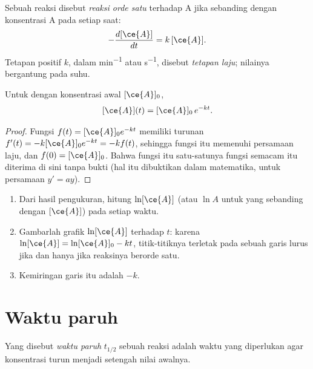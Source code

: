 \begin{definition}\label{def:g12:reaction-rates:first-order}
Sebuah reaksi disebut \emph{reaksi orde satu}
terhadap A jika  sebanding dengan konsentrasi A pada
setiap saat:
\[
  -\frac{d[\ce{A}]}{dt} = k\,[\ce{A}] .
\]
Tetapan positif $k$, dalam \si{min^{-1}} atau \si{s^{-1}}, disebut
\emph{tetapan laju}; nilainya bergantung pada suhu.
\end{definition}

\begin{proposition}\label{prop:g12:reaction-rates:exponential}
Untuk  dengan konsentrasi awal $[\ce{A}]_0$,
\[
  [\ce{A}](t) = [\ce{A}]_0\, e^{-kt} .
\]
\end{proposition}

\begin{proof}
Fungsi $f(t) = [\ce{A}]_0 e^{-kt}$ memiliki turunan
$f'(t) = -k [\ce{A}]_0 e^{-kt} = -k f(t)$, sehingga fungsi itu memenuhi
persamaan laju, dan $f(0) = [\ce{A}]_0$. Bahwa fungsi itu satu-satunya
fungsi semacam itu diterima di sini tanpa bukti (hal itu dibuktikan
dalam matematika, untuk persamaan $y' = ay$).
\end{proof}

\begin{method}\label{met:g12:reaction-rates:test}
\begin{enumerate}
  \item Dari hasil pengukuran, hitung $\ln [\ce{A}]$ (atau $\ln A$ untuk
         yang sebanding dengan $[\ce{A}]$) pada setiap waktu.
  \item Gambarlah grafik $\ln[\ce{A}]$ terhadap $t$: karena
        $\ln[\ce{A}] = \ln[\ce{A}]_0 - kt$, titik-titiknya terletak pada
        sebuah garis lurus jika dan hanya jika reaksinya berorde satu.
  \item Kemiringan garis itu adalah $-k$.
\end{enumerate}
\end{method}

\section{Waktu paruh}

\begin{definition}\label{def:g12:reaction-rates:half-life}
Yang disebut \emph{waktu paruh} $t_{1/2}$ sebuah
reaksi adalah waktu yang diperlukan agar konsentrasi 
turun menjadi setengah nilai awalnya.
\end{definition}


